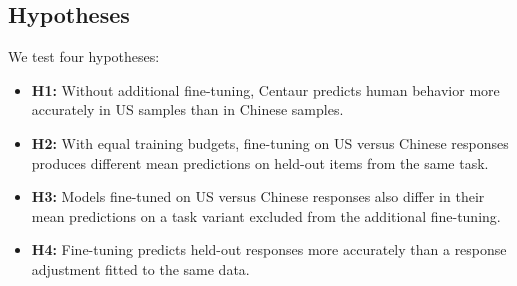 

\subsection{Hypotheses}

We test four hypotheses:

\begin{itemize}
\item \textbf{H1:} Without additional fine-tuning, Centaur predicts human behavior more accurately in US samples than in Chinese samples.

\item \textbf{H2:} With equal training budgets, fine-tuning on
US versus Chinese responses produces different mean predictions
on held-out items from the same task.

\item \textbf{H3:} Models fine-tuned on US versus Chinese responses
also differ in their mean predictions on a task variant excluded
from the additional fine-tuning.

\item \textbf{H4:} Fine-tuning predicts held-out responses more
accurately than a response adjustment fitted to the same data.
\end{itemize}
